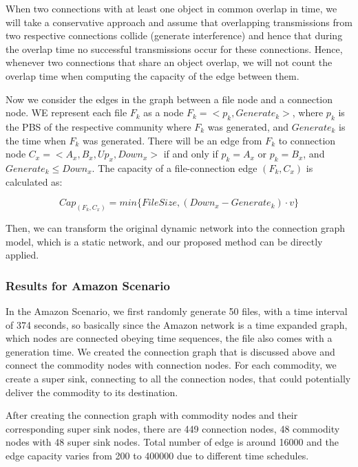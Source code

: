 \documentclass[conference]{IEEEtran}
\begin{document}
When two connections with at least one object in common overlap in time, we will take a conservative approach and assume that overlapping transmissions from  two respective connections collide (generate interference) and hence that during the overlap time no successful transmissions occur for these connections. Hence, whenever two connections that share an object overlap, we will not count the overlap time when computing the capacity of the edge between them.

Now we consider the edges in the graph between a file node and a connection node. WE represent each file $F_k$ as a node $F_k=<p_k,Generate_k>$, where $p_k$ is the PBS of the respective community where $F_k$ was generated, and $Generate_k$ is the time when $F_k$  was generated. There will be an edge from $F_k$ to connection node $C_x=<A_x, B_x, Up_x, Down_x>$ if and only if $p_k = A_x$ or $p_k = B_x$, and $Generate_k \leq Down_x$. The capacity of a file-connection edge $(F_k,C_x)$ is calculated as:

\begin{equation} \nonumber
Cap_{(F_k,C_x)} = min \{FileSize, (Down_x-Generate_k )\cdot v\}
\end{equation}


Then, we can transform the original dynamic network into the connection graph model, which is a static network, and our proposed method can be directly applied.


\subsubsection{Results for Amazon Scenario}

In the Amazon Scenario, we first randomly generate 50 files, with a time interval of 374 seconds, so basically since the Amazon network is a time expanded graph, which nodes are connected obeying time sequences, the file also comes with a generation time. We created the connection graph that is discussed above and connect the commodity nodes with connection nodes. For each commodity, we create a super sink, connecting to all the connection nodes, that could potentially deliver the commodity to its destination. 

After creating the connection graph with commodity nodes and their corresponding super sink nodes, there are 449 connection nodes, 48 commodity nodes with 48 super sink nodes. Total number of edge is around 16000 and the edge capacity varies from 200 to 400000 due to different time schedules. 
\end{document}
